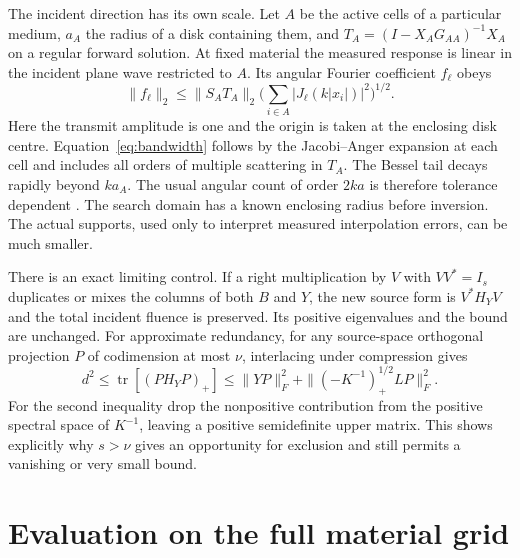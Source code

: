 \documentclass[anonymous,12pt]{iopjournal}
\newcommand{\tr}{\operatorname{tr}}\newcommand{\diag}{\operatorname{diag}}
\numberwithin{equation}{section}
\begin{document}
The incident direction has its own scale. Let $A$ be the active cells of a particular medium, $a_A$ the radius of a disk containing them, and $T_A=(I-X_A G_{AA})^{-1}X_A$ on a regular forward solution. At fixed material the measured response is linear in the incident plane wave restricted to $A$. Its angular Fourier coefficient $f_\ell$ obeys
\begin{equation}
 \|f_\ell\|_2\le
 \|S_AT_A\|_2\Big(\sum_{i\in A}|J_\ell(k|x_i|)|^2\Big)^{1/2}.
 \label{eq:bandwidth}
\end{equation}
Here the transmit amplitude is one and the origin is taken at the enclosing disk centre. Equation~\eqref{eq:bandwidth} follows by the Jacobi--Anger expansion at each cell and includes all orders of multiple scattering in $T_A$. The Bessel tail decays rapidly beyond $ka_A$. The usual angular count of order $2ka$ is therefore tolerance dependent \cite{bucci87,bucci89}. The search domain has a known enclosing radius before inversion. The actual supports, used only to interpret measured interpolation errors, can be much smaller.

There is an exact limiting control. If a right multiplication by $V$ with $VV^*=I_s$ duplicates or mixes the columns of both $B$ and $Y$, the new source form is $V^*H_YV$ and the total incident fluence is preserved. Its positive eigenvalues and the bound are unchanged. For approximate redundancy, for any source-space orthogonal projection $P$ of codimension at most $\nu$, interlacing under compression gives
\begin{equation}
 d^2\le\tr[(PH_YP)_+]\le
 \|YP\|_F^2+\|(-K^{-1})_+^{1/2}LP\|_F^2 .\label{eq:tail}
\end{equation}
For the second inequality drop the nonpositive contribution from the positive spectral space of $K^{-1}$, leaving a positive semidefinite upper matrix. This shows explicitly why $s>\nu$ gives an opportunity for exclusion and still permits a vanishing or very small bound.

\section{Evaluation on the full material grid}\label{sec:fourier}
\end{document}
